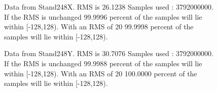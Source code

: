 \begin{figure}[ht] 				 				 				\caption{Data from Stand248X. RMS is 26.1238 Samples used : 3792000000. If the RMS is unchanged 99.9996 percent of the samples will lie within [-128,128).  				 With an RMS of 20 99.9998 percent of the samples will lie within [-128,128).} 				\end{figure} 

\begin{figure}[ht] 				 				 				\caption{Data from Stand248Y. RMS is 30.7076 Samples used : 3792000000. If the RMS is unchanged 99.9988 percent of the samples will lie within [-128,128).  				 With an RMS of 20 100.0000 percent of the samples will lie within [-128,128).} 				\end{figure} 

